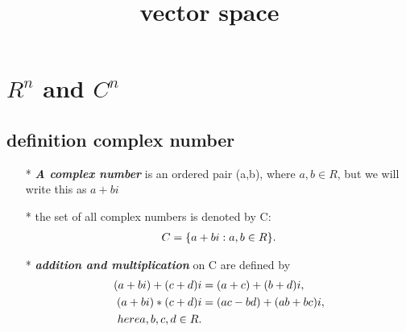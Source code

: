 \documentclass[a4paper,12pt]{article}
\begin{document}
\title {vector space}
\maketitle

\tableofcontents
\newpage


\section{$R^n$ and $C^n$}
\subsection{definition complex number}
    \begin{itemize}
        \item[*] \textbf{\textit{A complex number}} is an ordered pair (a,b), where $a, b \in R $, but we will write this as $a +bi$
        \item[*] the set of all complex numbers is denoted by C:
        \begin{align*}
           \notag C = \{ a + bi: a, b \in R \} . 
        \end{align*}
        \item[*]  \textbf{\textit{addition and multiplication}} on C are defined by \\
        \vspace{-2em}
        \begin{align*}
            \notag(a + bi) + (c + d)i &= (a + c) + (b + d)i, \\
            \notag(a + bi) * (c + d)i &= (ac - bd) + (ab + bc)i, \\
        \notag here a,b,c,d \in R.
        \end{align*}
    \end{itemize}
\end{document}
